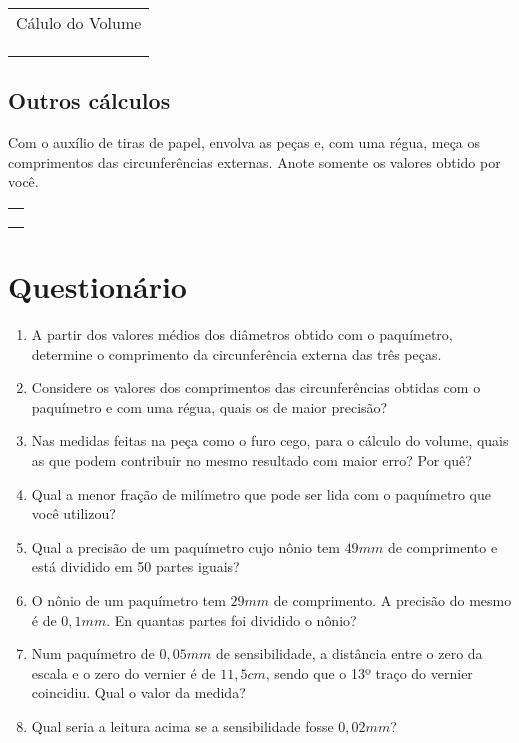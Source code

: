 \documentclass[10pt,a4paper,onecolumn,notitlepage]{scrartcl}
\begin{document}
\begin{table}[!ht]
\centering
\begin{tabular}{|p{10cm}|}
\hline Cálulo do Volume \\ 
\\
\\
\\
\hline
\end{tabular}
\end{table}

\subsection{Outros cálculos}
Com o auxílio de tiras de papel, envolva as peças e, com uma régua, meça os comprimentos das circunferências externas. Anote somente os valores obtido por você.

\begin{table}[!ht]
\centering
\begin{tabular}{|p{10cm}|}
\hline 
\\
\\
\\
\hline
\end{tabular}
\end{table}

\section{Questionário}
\begin{enumerate}
\item A partir dos valores médios dos diâmetros obtido com o paquímetro, determine o comprimento da circunferência externa das três peças.

\item Considere os valores dos comprimentos das circunferências obtidas com o paquímetro e com uma régua, quais os de maior precisão?

\item Nas medidas feitas na peça como o furo cego, para o cálculo do volume, quais as que podem contribuir no mesmo resultado com maior erro? Por quê?
\item Qual a menor fração de milímetro que pode ser lida com o paquímetro que você utilizou?
\item Qual a precisão de um paquímetro cujo nônio tem $49mm$ de comprimento e está dividido em 50 partes iguais?
\item O nônio de um paquímetro tem $29mm$ de comprimento. A precisão do mesmo é de $0,1mm$. En quantas partes foi dividido o nônio?
\item Num paquímetro de $0,05mm$ de sensibilidade, a distância  entre o zero da escala e o zero do vernier é de $11,5cm$, sendo que o 13º traço do vernier coincidiu. Qual o valor da medida?
\item Qual seria a leitura acima se a sensibilidade fosse $0,02mm$?
\end{enumerate}
\end{document}
